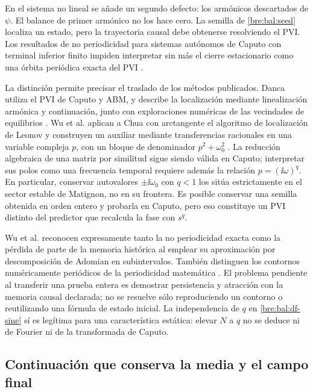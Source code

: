 En el sistema no lineal se añade un segundo defecto: los armónicos
descartados de \(\psi\). El balance de primer armónico no los hace
cero. La semilla de \eqref{bre:bal:seed} localiza un estado, pero la
trayectoria causal debe obtenerse resolviendo el PVI. Los resultados
de no periodicidad para sistemas autónomos de Caputo con terminal
inferior finito impiden interpretar sin más el cierre estacionario como
una órbita periódica exacta del PVI
\cite{TavazoeiHaeri2009,AreaLosadaNieto2014}.

La distinción permite precisar el traslado de los métodos publicados.
Danca utiliza el PVI de Caputo y ABM, y describe la localización mediante
linealización armónica y continuación, junto con exploraciones numéricas
de las vecindades de equilibrios \cite{Danca2017}. Wu et al. aplican a
Chua con arctangente el algoritmo de localización de Leonov y construyen
un auxiliar mediante transferencias racionales en una variable compleja
\(p\), con un bloque de denominador \(p^2+\omega_0^2\)
\cite{Wu2023ArctanChua}. La reducción algebraica de una matriz por
similitud sigue siendo válida en Caputo; interpretar sus polos como una
frecuencia temporal requiere además la relación \(p=(\ii\omega)^q\).
En particular, conservar autovalores \(\pm\ii\omega_0\) con \(q<1\)
los sitúa estrictamente en el sector estable de Matignon, no en su
frontera. Es posible conservar una semilla obtenida en orden entero y
probarla en Caputo, pero eso constituye un PVI distinto del predictor
que recalcula la fase con \(s^q\).

Wu et al. reconocen expresamente tanto la no periodicidad exacta como
la pérdida de parte de la memoria histórica al emplear su aproximación
por descomposición de Adomian en subintervalos. También distinguen los
contornos numéricamente periódicos de la periodicidad matemática
\cite{Wu2023ArctanChua}. El problema pendiente al transferir una
prueba entera es demostrar persistencia y atracción con la memoria
causal declarada; no se resuelve sólo reproduciendo un contorno o
reutilizando una fórmula de estado inicial. La independencia de \(q\)
en \eqref{bre:bal:df-sine} sí es legítima para una característica
estática: elevar \(N\) a \(q\) no se deduce ni de Fourier ni de
la transformada de Caputo.

\subsection{Continuación que conserva la media y el campo final}
\label{bre:bal:continuation}

